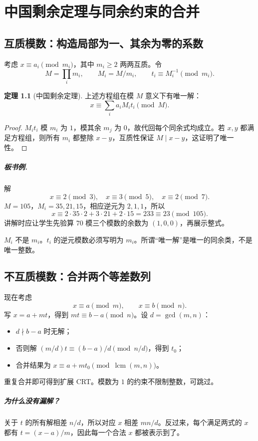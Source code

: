 \documentclass[UTF8,a4paper,11pt,oneside,openany,fontset=fandol]{ctexbook}
\theoremstyle{definition}
\newtheorem{theorem}[definition]{定理}
\newcommand{\lcm}{\operatorname{lcm}}
\begin{document}
\chapter{中国剩余定理与同余约束的合并}
\section{互质模数：构造局部为一、其余为零的系数}
考虑 $x\equiv a_i\pmod{m_i}$，其中 $m_i\ge2$ 两两互质。令
\[
 M=\prod_i m_i,\qquad M_i=M/m_i,\qquad t_i\equiv M_i^{-1}\pmod{m_i}.
\]
\begin{theorem}[中国剩余定理]
上述方程组在模 $M$ 意义下有唯一解：
\[
 x\equiv\sum_i a_iM_it_i\pmod M.
\]
\end{theorem}
\begin{proof}
$M_it_i$ 模 $m_i$ 为 $1$，模其余 $m_j$ 为 $0$，故代回每个同余式均成立。若 $x,y$ 都满足方程组，则所有 $m_i$ 都整除 $x-y$，互质性保证 $M\mid x-y$，这证明了唯一性。
\end{proof}

\paragraph{板书例.} 解
\[
 x\equiv2\pmod3,\quad x\equiv3\pmod5,\quad x\equiv2\pmod7.
\]
$M=105$，$M_i=35,21,15$，相应逆元为 $2,1,1$，所以
\[
 x\equiv2\cdot35\cdot2+3\cdot21+2\cdot15=233\equiv23\pmod{105}.
\]
讲解时应让学生先验算 $70$ 模三个模数的余数为 $(1,0,0)$，再展示整式。
\begin{pitfall}
$M_i$ 不是 $m_i$。$t_i$ 的逆元模数必须写明为 $m_i$。所谓“唯一解”是唯一的同余类，不是唯一整数。
\end{pitfall}


\section{不互质模数：合并两个等差数列}
现在考虑
\[
 x\equiv a\pmod m,\qquad x\equiv b\pmod n.
\]
写 $x=a+mt$，得到 $mt\equiv b-a\pmod n$。设 $d=\gcd(m,n)$：
\begin{itemize}
\item $d\nmid b-a$ 时无解；
\item 否则解 $(m/d)t\equiv(b-a)/d\pmod{n/d}$，得到 $t_0$；
\item 合并结果为 $x\equiv a+mt_0\pmod{\lcm(m,n)}$。
\end{itemize}
重复合并即可得到扩展 CRT。模数为 $1$ 的约束不限制整数，可跳过。


\paragraph{为什么没有漏解？}
关于 $t$ 的所有解相差 $n/d$，所以对应 $x$ 相差 $mn/d$。反过来，每个满足两式的 $x$ 都有 $t=(x-a)/m$，因此每一个合法 $x$ 都被表示到了。
\end{document}
